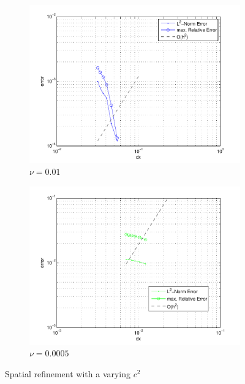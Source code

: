 \begin{figure}[!tbhp]
\centering
	\begin{subfigure}{0.48\textwidth}
		\centering
		\includegraphics[width=\textwidth]{./figures/wErrorVSdx_nu001_c2vary.pdf}	
		\caption{$\nu=0.01$}
	\end{subfigure}
	\begin{subfigure}{0.48\textwidth}
		\centering
		\includegraphics[width=\textwidth]{./figures/wErrorVSdx_nu00005_c2vary.pdf}	
		\caption{$\nu=0.0005$}
	\end{subfigure}
\caption{Spatial refinement with a varying $c^2$}
\label{fig:wErrorVSdx_varyingC2}
\end{figure}

